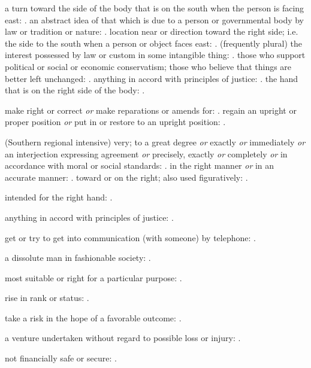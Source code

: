   a turn toward the side of the body that is on the south when the person is facing east: . an abstract idea of that which is due to a person or governmental body by law or tradition or nature: . location near or direction toward the right side; i.e. the side to the south when a person or object faces east: . (frequently plural) the interest possessed by law or custom in some intangible thing: . those who support political or social or economic conservatism; those who believe that things are better left unchanged: . anything in accord with principles of justice: . the hand that is on the right side of the body: .

  make right or correct \textit{or} make reparations or amends for: . regain an upright or proper position \textit{or} put in or restore to an upright position: .

  (Southern regional intensive) very; to a great degree \textit{or} exactly \textit{or} immediately \textit{or} an interjection expressing agreement \textit{or} precisely, exactly \textit{or} completely \textit{or} in accordance with moral or social standards: . in the right manner \textit{or} in an accurate manner: . toward or on the right; also used figuratively: .

  intended for the right hand: .

  anything in accord with principles of justice: .

  get or try to get into communication (with someone) by telephone: .

  a dissolute man in fashionable society: .

  most suitable or right for a particular purpose: .

  rise in rank or status: .

  take a risk in the hope of a favorable outcome: .

  a venture undertaken without regard to possible loss or injury: .

  not financially safe or secure: .


